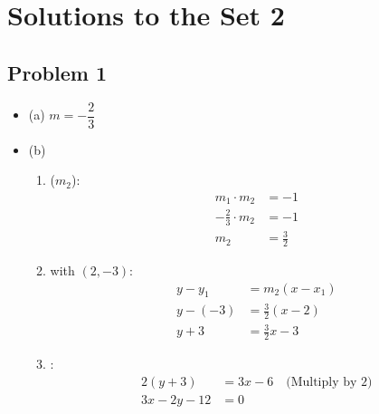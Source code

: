 \documentclass[12pt]{article}
\begin{document}
\section*{Solutions to the Set 2}
\subsection*{Problem 1}
\begin{itemize}
    \item (a) \(m=-\dfrac{2}{3}\)
    \item (b) \begin{enumerate}
    \item {} ($m_2$):
    \begin{align*}
        m_1 \cdot m_2 &= -1 \\
        -\tfrac{2}{3} \cdot m_2 &= -1 \\
        m_2 &= \tfrac{3}{2}
    \end{align*}
    
    \item {} with $(2,-3)$:
    \begin{align*}
        y - y_1 &= m_2(x - x_1) \\
        y - (-3) &= \tfrac{3}{2}(x - 2) \\
        y + 3 &= \tfrac{3}{2}x - 3
    \end{align*}
    
    \item {}:
    \begin{align*}
        2(y + 3) &= 3x - 6 \quad \text{(Multiply by 2)} \\
        3x - 2y - 12 &= 0
    \end{align*}
\end{enumerate}
\end{itemize}
\end{document}
